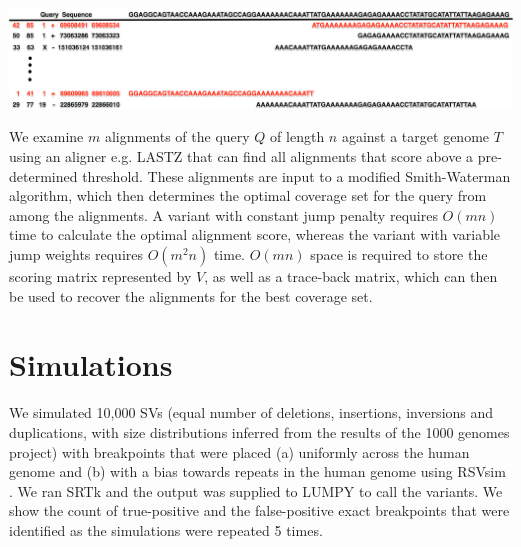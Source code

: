 \documentclass[a0,final]{a0poster}
\begin{document}
\begin{multicols}{2}
{
\centering
\includegraphics[scale = 0.7]{motivation/motivation2.png}
}
\vspace{10mm}

We examine $m$ alignments of the query $Q$ of length $n$ against a
target genome $T$ using an aligner e.g. LASTZ \cite{rsharris} that can find all 
alignments that score above a pre-determined threshold. These alignments are
input to a modified Smith-Waterman algorithm, which then determines the optimal
coverage set for the query from among the alignments. A variant with constant 
jump penalty requires $O(mn)$  time to calculate the optimal alignment score, 
whereas the variant with variable jump weights requires $O(m^2n)$ time. 
$O(mn)$ space is required to store the  scoring matrix represented by $V$, 
as well as a trace-back matrix, which can  then be used to recover the 
alignments for the best coverage set. 

\section*{Simulations}

We simulated 10,000 SVs (equal number of deletions, insertions, inversions and
duplications, with size distributions inferred from the results of the 1000
genomes project) with breakpoints that were placed (a) uniformly across the human
genome and (b) with a bias towards repeats in the human  genome using RSVsim \cite{Bartenhagen01072013}.  We ran SRTk and the output was
supplied to LUMPY \cite{ryan} to call the variants. We show the count of
true-positive and the false-positive exact breakpoints that were identified as the simulations were repeated 5 times.


\end{multicols}
\end{document}
